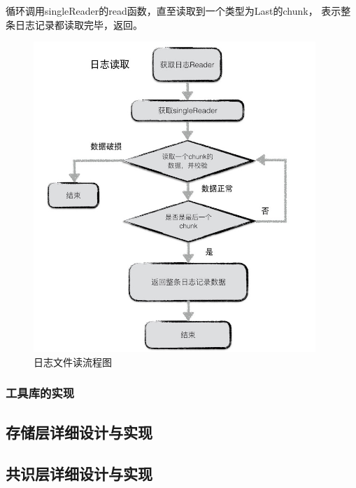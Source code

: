 \begin{enumerate}
		循环调用singleReader的read函数，直至读取到一个类型为Last的chunk，
		表示整条日志记录都读取完毕，返回。

		\begin{figure}[H]
			\centering
			\includegraphics[width=0.95\textwidth]{images/journal_read}
			\caption{日志文件读流程图}
			\label{journal_read}
		\end{figure}
		
		
	
	\end{enumerate}
	
   	\subsubsection{工具库的实现}
    


  	\subsection{存储层详细设计与实现}
	

	
  	\subsection{共识层详细设计与实现}



